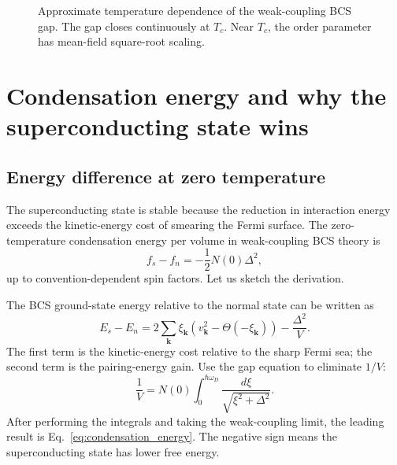 \documentclass[11pt]{article}
\numberwithin{equation}{section}
\newcommand{\kvec}{\bm{k}}
\newcommand{\Nzero}{N(0)}
\begin{document}
\begin{figure}[H]
\centering
{}
\caption{Approximate temperature dependence of the weak-coupling BCS gap. The gap closes continuously at $T_c$. Near $T_c$, the order parameter has mean-field square-root scaling.}
\end{figure}

\section{Condensation energy and why the superconducting state wins}

\subsection{Energy difference at zero temperature}

The superconducting state is stable because the reduction in interaction energy exceeds the kinetic-energy cost of smearing the Fermi surface. The zero-temperature condensation energy per volume in weak-coupling BCS theory is
\begin{equation}
\boxed{f_s-f_n=-\frac{1}{2}\Nzero\Delta^2,}
\label{eq:condensation_energy}
\end{equation}
up to convention-dependent spin factors. Let us sketch the derivation.

The BCS ground-state energy relative to the normal state can be written as
\begin{equation}
E_s-E_n=2\sum_{\kvec}\xi_{\kvec}\left(v_{\kvec}^2-\Theta(-\xi_{\kvec})\right)-\frac{\Delta^2}{V}.
\end{equation}
The first term is the kinetic-energy cost relative to the sharp Fermi sea; the second term is the pairing-energy gain. Use the gap equation to eliminate $1/V$:
\begin{equation}
\frac{1}{V}=\Nzero\int_0^{\hbar\omega_D}\frac{d\xi}{\sqrt{\xi^2+\Delta^2}}.
\end{equation}
After performing the integrals and taking the weak-coupling limit, the leading result is Eq.~\eqref{eq:condensation_energy}. The negative sign means the superconducting state has lower free energy.
\end{document}
